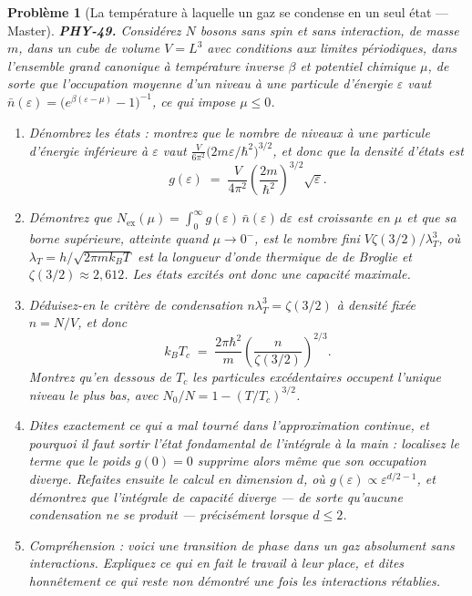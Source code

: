 \documentclass[11pt]{article}
\newtheorem{problem}{Problème}
\begin{document}
\begin{problem}[{La température à laquelle un gaz se condense en un seul état --- Master}]
\textbf{PHY-49.} Considérez $N$ bosons sans spin et sans interaction, de masse $m$, dans un
cube de volume $V = L^{3}$ avec conditions aux limites périodiques, dans l'ensemble grand
canonique à température inverse $\beta$ et potentiel chimique $\mu$, de sorte que l'occupation
moyenne d'un niveau à une particule d'énergie $\varepsilon$ vaut
$\bar{n}(\varepsilon) = \bigl(e^{\beta(\varepsilon-\mu)}-1\bigr)^{-1}$, ce qui impose
$\mu \le 0$.
\begin{enumerate}
\item[(a)] Dénombrez les états : montrez que le nombre de niveaux à une particule d'énergie inférieure à
$\varepsilon$ vaut $\frac{V}{6\pi^{2}}\bigl(2m\varepsilon/\hbar^{2}\bigr)^{3/2}$, et donc que
la densité d'états est
\[ g(\varepsilon) \;=\; \frac{V}{4\pi^{2}}\left(\frac{2m}{\hbar^{2}}\right)^{\!3/2}\sqrt{\varepsilon}. \]
\item[(b)] Démontrez que $N_{\mathrm{ex}}(\mu) = \int_{0}^{\infty} g(\varepsilon)\,\bar{n}(\varepsilon)\,
d\varepsilon$ est croissante en $\mu$ et que sa borne supérieure, atteinte quand
$\mu \to 0^{-}$, est le nombre \textit{fini} $V\zeta(3/2)/\lambda_T^{3}$, où
$\lambda_T = h/\sqrt{2\pi m k_B T}$ est la longueur d'onde thermique de de Broglie et
$\zeta(3/2) \approx 2{,}612$. Les états excités ont donc une capacité maximale.
\item[(c)] Déduisez-en le critère de condensation $n\lambda_T^{3} = \zeta(3/2)$ à densité fixée
$n = N/V$, et donc
\[ k_B T_c \;=\; \frac{2\pi\hbar^{2}}{m}\left(\frac{n}{\zeta(3/2)}\right)^{\!2/3}. \]
Montrez qu'en dessous de $T_c$ les particules excédentaires occupent l'unique niveau le plus
bas, avec $N_0/N = 1 - (T/T_c)^{3/2}$.
\item[(d)] Dites exactement ce qui a mal tourné dans l'approximation continue, et pourquoi il faut sortir
l'état fondamental de l'intégrale à la main : localisez le terme que le poids $g(0)=0$ supprime
alors même que son occupation diverge. Refaites ensuite le calcul en dimension $d$, où
$g(\varepsilon)\propto \varepsilon^{d/2 - 1}$, et démontrez que l'intégrale de capacité diverge
--- de sorte qu'aucune condensation ne se produit --- précisément lorsque $d \le 2$.
\item[(e)] Compréhension : voici une transition de phase dans un gaz absolument sans interactions.
Expliquez ce qui en fait le travail à leur place, et dites honnêtement ce qui reste non démontré
une fois les interactions rétablies.
\end{enumerate}

\end{problem}
\end{document}
